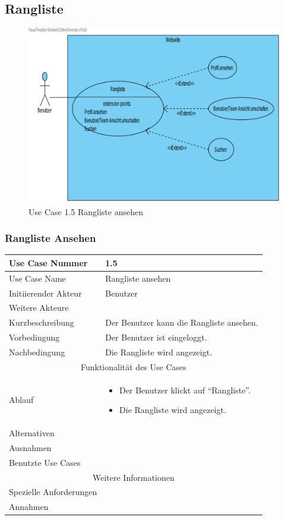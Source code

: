 \documentclass[10pt,a4paper]{article}
\begin{document}
\subsection{Rangliste}
	\begin{figure}[H]
		\includegraphics[width=\linewidth]{gfx/webseite/rangliste.pdf}
                \caption{Use Case 1.5 Rangliste ansehen}
        \end{figure}

\subsubsection{Rangliste Ansehen}
	\begin{tabularx}{\textwidth}{|l|X|}
	\hline Use Case Nummer & 1.5 \\ 
	\hline Use Case Name & Rangliste ansehen \\ 
	\hline Initiierender Akteur & Benutzer \\
	\hline Weitere Akteure &  \\
	\hline Kurzbeschreibung & Der Benutzer kann die Rangliste ansehen. \\
	\hline Vorbedingung & Der Benutzer ist eingeloggt. \\
	\hline Nachbedingung & Die Rangliste wird angezeigt. \\
	\hline \multicolumn{2}{|c|}{Funktionalität des Use Cases}\\
	\hline Ablauf & \begin{itemize}
                \item Der Benutzer klickt auf ``Rangliste''. 
                \item Die Rangliste wird angezeigt.
                \end{itemize}\\
	\hline Alternativen & \\
	\hline Ausnahmen &  \\
	\hline Benutzte Use Cases &  \\
	\hline \multicolumn{2}{|c|}{Weitere Informationen} \\
	\hline Spezielle Anforderungen &  \\
	\hline Annahmen &  \\
	\hline
	\end{tabularx}
        
\end{document}
